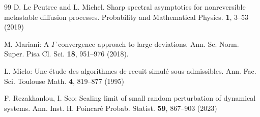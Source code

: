 \documentclass[reqno]{amsart}
\theoremstyle{plain}
\theoremstyle{definition}
\newcounter{as}[section]
\newcommand{\<}{\langle}
\renewcommand{\>}{\rangle}
\begin{document}
\begin{thebibliography}{99}
 D. Le Peutrec and L. Michel. Sharp spectral asymptotics
for nonreversible metastable diffusion processes. Probability and
Mathematical Physics. \textbf{1}, 3--53 (2019)

 M. Mariani: A $\Gamma$-convergence approach to large
deviations.  Ann. Sc. Norm. Super. Pisa Cl. Sci. {\bf 18}, 951--976
(2018).

 L. Miclo: Une \'{e}tude des algorithmes de recuit
simul\'{e} sous-admissibles. Ann. Fac. Sci. Toulouse
Math. \textbf{4}, 819--877 (1995)

 F. Rezakhanlou, I. Seo: Scaling limit of small random
perturbation of dynamical systems. Ann. Inst. H. Poincar\'{e}
Probab. Statist. \textbf{59}, 867--903 (2023)


\end{thebibliography}
\end{document}
